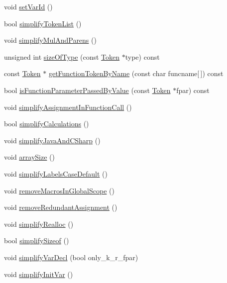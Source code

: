 \begin{DoxyCompactItemize}
\item 
void \hyperlink{class_tokenizer_a7a34570dbecff212027ff401915e0a7e}{set\-Var\-Id} ()
\item 
bool \hyperlink{class_tokenizer_a831fde8399875de9890ee2dc03e6b5fb}{simplify\-Token\-List} ()
\item 
void \hyperlink{class_tokenizer_af6e5886b4d2907eadb2eb6768c2e3a82}{simplify\-Mul\-And\-Parens} ()
\item 
unsigned int \hyperlink{class_tokenizer_a6e5adaed9402c3131ea43ce7d64ecd74}{size\-Of\-Type} (const \hyperlink{class_token}{Token} $\ast$type) const 
\item 
const \hyperlink{class_token}{Token} $\ast$ \hyperlink{class_tokenizer_a11af512dd37794e12d72718182000836}{get\-Function\-Token\-By\-Name} (const char funcname\mbox{[}$\,$\mbox{]}) const 
\item 
bool \hyperlink{class_tokenizer_a51739a30b1c0bbe6655481aae241d4ab}{is\-Function\-Parameter\-Passed\-By\-Value} (const \hyperlink{class_token}{Token} $\ast$fpar) const 
\item 
void \hyperlink{class_tokenizer_adab655da41f157375945d6d2fee8d112}{simplify\-Assignment\-In\-Function\-Call} ()
\item 
bool \hyperlink{class_tokenizer_a3b12f64cac239412373bdefd80d582fd}{simplify\-Calculations} ()
\item 
void \hyperlink{class_tokenizer_ad53b6168d31dace4388ef9c8f79678ed}{simplify\-Java\-And\-C\-Sharp} ()
\item 
void \hyperlink{class_tokenizer_a94acfdf51eb49ebccc0170342c788db3}{array\-Size} ()
\item 
void \hyperlink{class_tokenizer_a0498a8650aa880d68cf78fe468e37fef}{simplify\-Labels\-Case\-Default} ()
\item 
void \hyperlink{class_tokenizer_a23a3207e92de4385c32375ef55cfb879}{remove\-Macros\-In\-Global\-Scope} ()
\item 
void \hyperlink{class_tokenizer_a025789931af4eff6087add0b4b11db2f}{remove\-Redundant\-Assignment} ()
\item 
void \hyperlink{class_tokenizer_a79a0495a1d9b030525764773a1a94513}{simplify\-Realloc} ()
\item 
bool \hyperlink{class_tokenizer_a76d4ed6ce491f77999f0662bc99e6da7}{simplify\-Sizeof} ()
\item 
void \hyperlink{class_tokenizer_a53bdb1e75d8b43c77dca6332e17ac39c}{simplify\-Var\-Decl} (bool only\-\_\-k\-\_\-r\-\_\-fpar)
\item 
void \hyperlink{class_tokenizer_a4497fcfc3628b7a47279945cbe4b7416}{simplify\-Init\-Var} ()

\end{DoxyCompactItemize}
